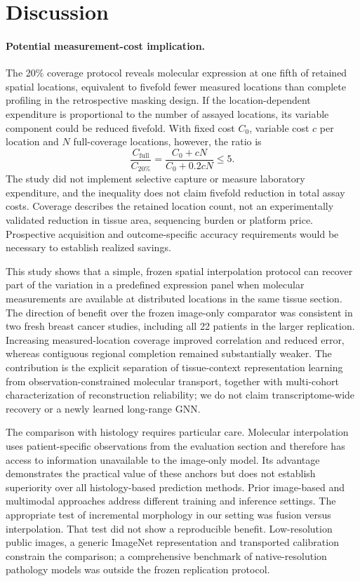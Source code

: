 \section{Discussion}
\paragraph{Potential measurement-cost implication.}
The 20\% coverage protocol reveals molecular expression at one fifth of retained spatial locations, equivalent to fivefold fewer measured locations than complete profiling in the retrospective masking design. If the location-dependent expenditure is proportional to the number of assayed locations, its variable component could be reduced fivefold. With fixed cost $C_0$, variable cost $c$ per location and $N$ full-coverage locations, however, the ratio is
\begin{equation}
\frac{C_{\mathrm{full}}}{C_{20\%}}=\frac{C_0+cN}{C_0+0.2cN}\leq 5.
\label{eq:cost_ratio}
\end{equation}
The study did not implement selective capture or measure laboratory expenditure, and the inequality does not claim fivefold reduction in total assay costs. Coverage describes the retained location count, not an experimentally validated reduction in tissue area, sequencing burden or platform price. Prospective acquisition and outcome-specific accuracy requirements would be necessary to establish realized savings.


This study shows that a simple, frozen spatial interpolation protocol can recover part of the variation in a predefined expression panel when molecular measurements are available at distributed locations in the same tissue section. The direction of benefit over the frozen image-only comparator was consistent in two fresh breast cancer studies, including all 22 patients in the larger replication. Increasing measured-location coverage improved correlation and reduced error, whereas contiguous regional completion remained substantially weaker. The contribution is the explicit separation of tissue-context representation learning from observation-constrained molecular transport, together with multi-cohort characterization of reconstruction reliability; we do not claim transcriptome-wide recovery or a newly learned long-range GNN.

The comparison with histology requires particular care. Molecular interpolation uses patient-specific observations from the evaluation section and therefore has access to information unavailable to the image-only model. Its advantage demonstrates the practical value of these anchors but does not establish superiority over all histology-based prediction methods. Prior image-based and multimodal approaches address different training and inference settings\cite{he2020,monjo2022,bergenstrahle2022,liu2026}. The appropriate test of incremental morphology in our setting was fusion versus interpolation. That test did not show a reproducible benefit. Low-resolution public images, a generic ImageNet representation and transported calibration constrain the comparison; a comprehensive benchmark of native-resolution pathology models was outside the frozen replication protocol.


